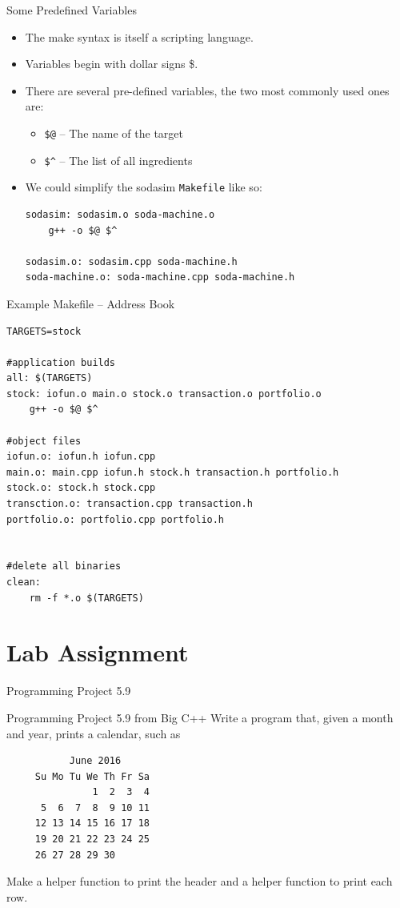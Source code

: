 \documentclass[]{beamer}
\begin{document}
\begin{frame}[fragile]{Some Predefined Variables}
\begin{itemize}[<+->]
    \item The make syntax is itself a scripting language.
    \item Variables begin with dollar signs \$.  
    \item There are several pre-defined variables, the two most
        commonly used ones are:
        \begin{itemize}
            \item \verb!$@! -- The name of the target
            \item \verb!$^! -- The list of all ingredients
        \end{itemize}
    \item We could simplify the sodasim \texttt{Makefile} like so:
\begin{adjustbox}{max width=\textwidth, max totalheight=0.9\textheight}
\begin{BVerbatim}
sodasim: sodasim.o soda-machine.o
    g++ -o $@ $^

sodasim.o: sodasim.cpp soda-machine.h
soda-machine.o: soda-machine.cpp soda-machine.h
\end{BVerbatim}
\end{adjustbox}
\end{itemize}
\end{frame}

\begin{frame}[fragile]{Example Makefile -- Address Book}
\begin{adjustbox}{max width=\textwidth, max totalheight=0.9\textheight}
\begin{BVerbatim}
TARGETS=stock

#application builds
all: $(TARGETS)
stock: iofun.o main.o stock.o transaction.o portfolio.o
	g++ -o $@ $^

#object files
iofun.o: iofun.h iofun.cpp
main.o: main.cpp iofun.h stock.h transaction.h portfolio.h
stock.o: stock.h stock.cpp
transction.o: transaction.cpp transaction.h
portfolio.o: portfolio.cpp portfolio.h


#delete all binaries
clean:
	rm -f *.o $(TARGETS)
\end{BVerbatim}
\end{adjustbox}
\end{frame}

\section{Lab Assignment}
\begin{frame}[fragile]{Programming Project 5.9}
\begin{block}{Programming Project 5.9 from Big C++}
Write a program that, given a month and year, prints a calendar, such as
\begin{verbatim}
           June 2016
     Su Mo Tu We Th Fr Sa
               1  2  3  4
      5  6  7  8  9 10 11
     12 13 14 15 16 17 18
     19 20 21 22 23 24 25
     26 27 28 29 30
\end{verbatim}
Make a helper function to print the header and a helper function to print each
row.
\end{block}
\end{frame}
\end{document}
